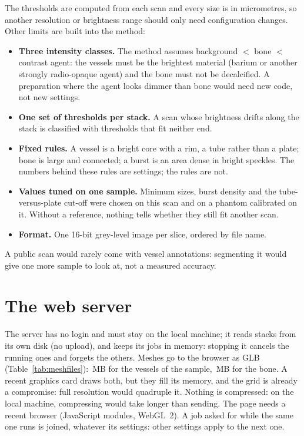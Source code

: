 The thresholds are computed from each scan and every size is in micrometres, so another resolution or
brightness range should only need configuration changes. Other limits are built into the method:
\begin{itemize}
  \item \textbf{Three intensity classes.} The method assumes background $<$ bone $<$ contrast agent:
        the vessels must be the brightest material (barium or another strongly radio-opaque agent) and
        the bone must not be decalcified. A preparation where the agent looks dimmer than bone would
        need new code, not new settings.
  \item \textbf{One set of thresholds per stack.} A scan whose brightness drifts along the stack is
        classified with thresholds that fit neither end.
  \item \textbf{Fixed rules.} A vessel is a bright core with a rim, a tube rather than a plate; bone is
        large and connected; a burst is an area dense in bright speckles. The numbers behind these rules
        are settings; the rules are not.
  \item \textbf{Values tuned on one sample.} Minimum sizes, burst density and the tube-versus-plate
        cut-off were chosen on this scan and on a phantom calibrated on it. Without a reference, nothing
        tells whether they still fit another scan.
  \item \textbf{Format.} One 16-bit grey-level image per slice, ordered by file name.
\end{itemize}
A public scan would rarely come with vessel annotations: segmenting it would give one more sample to
look at, not a measured accuracy.

\section{The web server}

The server has no login and must stay on the local machine; it reads stacks from its own disk (no
upload), and keeps its jobs in memory: stopping it cancels the running ones and forgets the others.
Meshes go to the browser as GLB (Table~\ref{tab:meshfiles}): \pbValueMeshVesselGlbMB\,MB for the
vessels of the sample, \pbValueMeshBoneGlbMB\,MB for the bone. A recent graphics card draws both, but
they fill its memory, and the \pbValueMeshGridUm\um{} grid is already a compromise: full resolution
would quadruple it. Nothing is compressed: on
the local machine, compressing would take longer than sending. The page needs a recent browser
(JavaScript modules, WebGL~2). A job asked for while the same one runs is joined, whatever its
settings: other settings apply to the next one.

